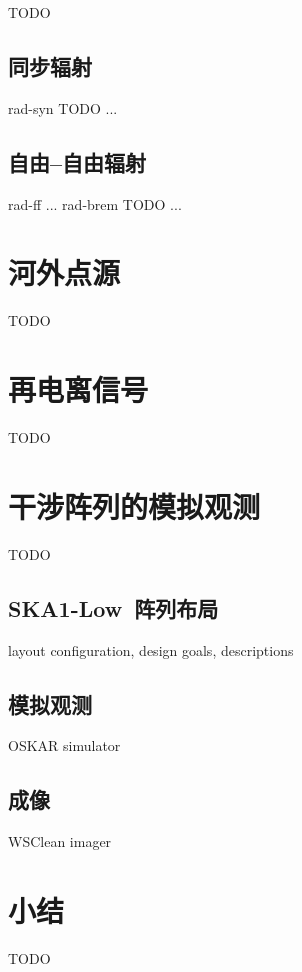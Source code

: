 TODO

\subsection{同步辐射}

\ac{rad-syn} TODO ...

\subsection{自由--自由辐射}
\label{sec:simu-gff}

\ac{rad-ff} ...
\ac{rad-brem} TODO ...


\section{河外点源}

TODO


\section{再电离信号}

TODO


\section{干涉阵列的模拟观测}

TODO

\subsection{SKA1-Low~阵列布局}

layout configuration, design goals, descriptions

\subsection{模拟观测}

OSKAR simulator

\subsection{成像}
\label{sec:imaging}

WSClean imager


\section{小结}

TODO


